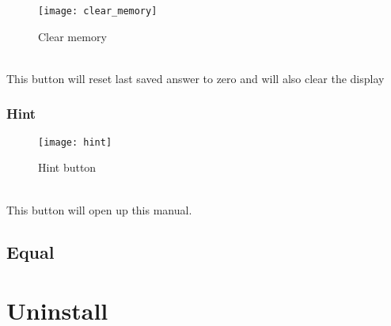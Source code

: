 \documentclass[11pt, a4paper]{article}
\begin{document}
    \begin{figure}[h]
        \caption{Clear memory}
        \texttt{[image: clear\_memory]}
        \centering
        \label{fig:c}
    \end{figure}
    \\
    This button will reset last saved answer to zero and will also clear the display

    \subsubsection[scale = 0.2]{Hint}
    \label{subsubsec:hint}


    \begin{figure}[h]
        \caption{Hint button}
        \texttt{[image: hint]}
        \centering
        \label{fig:h}
    \end{figure}
    \\
    This button will open up this manual.

    \newpage

    \subsection{Equal}
    \label{subsec:equal}


    \section{Uninstall}
    \label{sec:uninstall}
\end{document}
